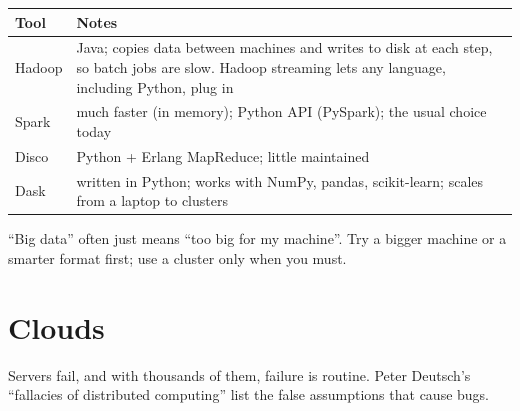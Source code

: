 \begin{center}
\end{center}

\begin{center}
\begin{tabularx}{\linewidth}{@{}l X@{}}
\toprule
\textbf{Tool} & \textbf{Notes} \\
\midrule
Hadoop & Java; copies data between machines and writes to disk at each step, so batch jobs are slow. Hadoop streaming lets any language, including Python, plug in \\
Spark & much faster (in memory); Python API (PySpark); the usual choice today \\
Disco & Python + Erlang MapReduce; little maintained \\
Dask & written in Python; works with NumPy, pandas, scikit-learn; scales from a laptop to clusters \\
\bottomrule
\end{tabularx}
\end{center}

``Big data'' often just means ``too big for my machine''. Try a bigger machine or a
smarter format first; use a cluster only when you must.

\section{Clouds}

Servers fail, and with thousands of them, failure is routine. Peter Deutsch's ``fallacies
of distributed computing'' list the false assumptions that cause bugs.

